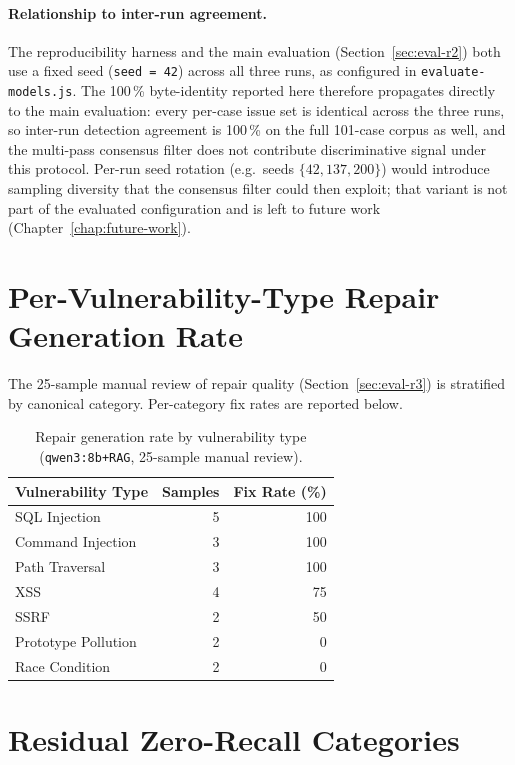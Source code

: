 \paragraph{Relationship to inter-run agreement.}
The reproducibility harness and the main evaluation (Section~\ref{sec:eval-r2}) both use a fixed seed (\texttt{seed = 42}) across all three runs, as configured in \texttt{evaluate-models.js}. The 100\,\% byte-identity reported here therefore propagates directly to the main evaluation: every per-case issue set is identical across the three runs, so inter-run detection agreement is 100\,\% on the full 101-case corpus as well, and the multi-pass consensus filter does not contribute discriminative signal under this protocol. Per-run seed rotation (e.g.\ seeds $\{42, 137, 200\}$) would introduce sampling diversity that the consensus filter could then exploit; that variant is not part of the evaluated configuration and is left to future work (Chapter~\ref{chap:future-work}).

\section{Per-Vulnerability-Type Repair Generation Rate}
\label{app:r3-by-type}

The 25-sample manual review of repair quality (Section~\ref{sec:eval-r3}) is stratified by canonical category. Per-category fix rates are reported below.

\begin{table}[H]
\centering
\caption{Repair generation rate by vulnerability type (\texttt{qwen3:8b+RAG}, 25-sample manual review).}
\label{tab:r3-by-type-app}
\footnotesize
\begin{tabular}{@{}lrr@{}}
\toprule
\textbf{Vulnerability Type} & \textbf{Samples} & \textbf{Fix Rate (\%)} \\
\midrule
SQL Injection       & 5 & 100 \\
Command Injection   & 3 & 100 \\
Path Traversal      & 3 & 100 \\
XSS                 & 4 & 75  \\
SSRF                & 2 & 50  \\
Prototype Pollution & 2 & 0   \\
Race Condition      & 2 & 0   \\
\bottomrule
\end{tabular}
\end{table}

\section{Residual Zero-Recall Categories}
\label{app:failure-modes}

